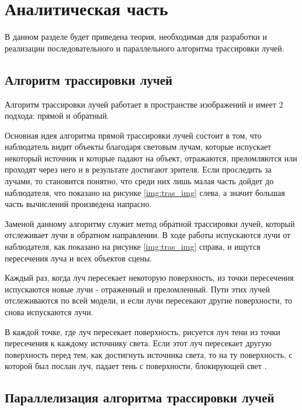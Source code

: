 \chapter{Аналитическая часть}

В данном разделе будет приведена теория, необходимая для разработки и реализации последовательного и параллельного алгоритма трассировки лучей.

\section{Алгоритм трассировки лучей}

 Алгоритм трассировки лучей работает в пространстве изображений и имеет 2 подхода: прямой и обратный.
 
 Основная идея алгоритма прямой трассировки лучей состоит в том, что наблюдатель видит объекты благодаря световым лучам, которые испускает некоторый источник и которые падают на объект, отражаются, преломляются или проходят через него и в результате достигают зрителя. Если проследить за лучами, то становится понятно, что среди них лишь малая часть дойдет до наблюдателя, что показано на рисунке \ref{img:tras_img} слева, а значит большая часть вычислений произведена напрасно.
 
 
 

 Заменой данному алгоритму служит метод обратной трассировки лучей, который отслеживает лучи в обратном направлении. В ходе работы испускаются лучи от наблюдателя, как показано на рисунке \ref{img:tras_img} справа, и ищутся пересечения луча и всех объектов сцены.
  
 Каждый раз, когда луч пересекает некоторую поверхность, из точки пересечения испускаются новые лучи - отраженный и преломленный. Пути этих лучей отслеживаются по всей модели, и если лучи пересекают другие поверхности, то снова испускаются лучи. 
 
 В каждой точке, где луч пересекает поверхность, рисуется луч тени из точки пересечения к каждому источнику света. Если этот луч пересекает другую поверхность перед тем, как достигнуть источника света, то на ту поверхность, с которой был послан луч, падает тень с поверхности, блокирующей свет \cite{trass}.
 


\section{Параллелизация алгоритма трассировки лучей}

